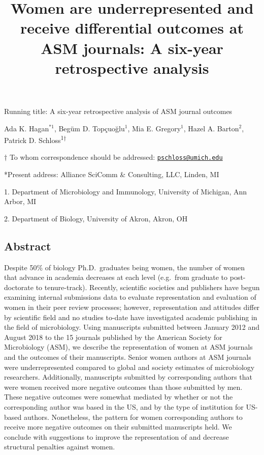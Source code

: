 \documentclass[11pt,]{article}
\title{\textbf{Women are underrepresented and receive differential outcomes at
ASM journals: A six-year retrospective analysis}}
\author{}
\date{\vspace{-2.5em}}
\begin{document}
\maketitle

\vspace{35mm}

Running title: A six-year retrospective analysis of ASM journal outcomes

\vspace{35mm}

Ada K. Hagan\(^{*1}\), Begüm D. Topçuoğlu\({^1}\), Mia E.
Gregory\({^1}\), Hazel A. Barton\({^2}\), Patrick D.
Schloss\textsuperscript{1\(\dagger\)}

\vspace{40mm}

\(\dagger\) To whom correspondence should be addressed:
\href{mailto:pschloss@umich.edu}{\nolinkurl{pschloss@umich.edu}}

*Present address: Alliance SciComm \& Consulting, LLC, Linden, MI

1. Department of Microbiology and Immunology, University of Michigan,
Ann Arbor, MI

2. Department of Biology, University of Akron, Akron, OH

\newpage

\linenumbers

\subsection{Abstract}\label{abstract}

Despite 50\% of biology Ph.D.~graduates being women, the number of women
that advance in academia decreases at each level (e.g.~from graduate to
post-doctorate to tenure-track). Recently, scientific societies and
publishers have begun examining internal submissions data to evaluate
representation and evaluation of women in their peer review processes;
however, representation and attitudes differ by scientific field and no
studies to-date have investigated academic publishing in the field of
microbiology. Using manuscripts submitted between January 2012 and
August 2018 to the 15 journals published by the American Society for
Microbiology (ASM), we describe the representation of women at ASM
journals and the outcomes of their manuscripts. Senior women authors at
ASM journals were underrepresented compared to global and society
estimates of microbiology researchers. Additionally, manuscripts
submitted by corresponding authors that were women received more
negative outcomes than those submitted by men. These negative outcomes
were somewhat mediated by whether or not the corresponding author was
based in the US, and by the type of institution for US-based authors.
Nonetheless, the pattern for women corresponding authors to receive more
negative outcomes on their submitted manuscripts held. We conclude with
suggestions to improve the representation of and decrease structural
penalties against women.
\end{document}
